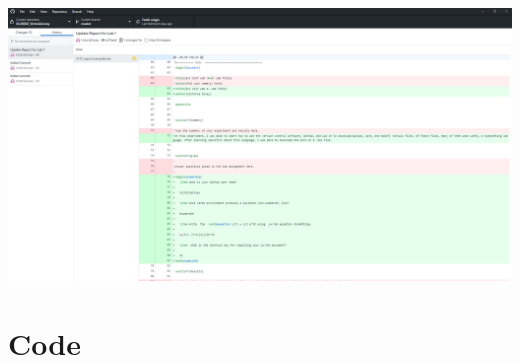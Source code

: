 \documentclass[11pt]{article}
\newcommand{\Verilog}[2][]{%
	
}
\begin{document}
\includegraphics[width=01\textwidth,trim=0cm 6cm 15cm 0.8cm,clip]{GitHub_Screenshot}


\section*{Code}

\Verilog[caption=File-included example code,label=code:file_ex]{lab1_example_code.sv}
\end{document}
